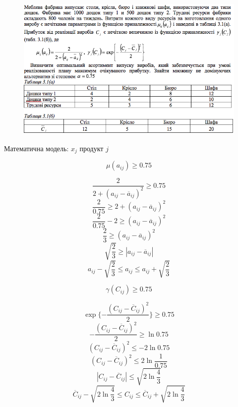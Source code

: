 
  \begin{center}
    \normalsize{}
  \end{center}

  \begin{figure}[h!]
    \centering
    \includegraphics[width=14cm]{3_1.png}
    \centering
  \end{figure}

Математична модель: $x_{j}$ продукт $j$

\begin{multicols}{2}
  $$\mu(a_{ij}) \geqslant 0.75  $$

  $$\dfrac{2}{2+(a_{ij}-\overline{a}_{ij})^2} \geqslant 0.75$$
  $$\dfrac{2}{0.75} \geqslant 2+(a_{ij}-\overline{a}_{ij})^2$$
  $$\dfrac{2}{0.75} - 2 \geqslant (a_{ij}-\overline{a}_{ij})^2$$
  $$\dfrac{2}{3} \geqslant (a_{ij}-\overline{a}_{ij})^2$$
  $$ \sqrt{\dfrac{2}{3}} \geqslant |a_{ij}-\overline{a}_{ij}|$$
  $$ a_{ij} - \sqrt{\dfrac{2}{3}} \leqslant a_{ij} \leqslant a_{ij} + \sqrt{\dfrac{2}{3}}$$

  \columnbreak

  $$\gamma(C_{ij}) \geqslant 0.75 $$

  $$\exp\{ - \dfrac{(C_{ij}-\overline{C}_{ij})^2}{2} \} \geqslant 0.75 $$
  $$- \dfrac{(C_{ij}-\overline{C}_{ij})^2}{2} \geqslant \ln{0.75} $$
  $$ (C_{ij}-\overline{C}_{ij})^2 \leqslant -2 \ln{0.75} $$
  $$ (C_{ij}-\overline{C}_{ij})^2 \leqslant 2 \ln{\dfrac{1}{0.75}} $$
  $$|C_{ij}-\overline{C}_{ij}| \leqslant \sqrt{2\ln{\dfrac{4}{3}}} $$
  $$ \overline{C}_{ij} - \sqrt{2 \ln{\dfrac{4}{3}}} \leqslant C_{ij} \leqslant \overline{C}_{ij} + \sqrt{ 2 \ln{\dfrac{4}{3}}}$$

\end{multicols}

